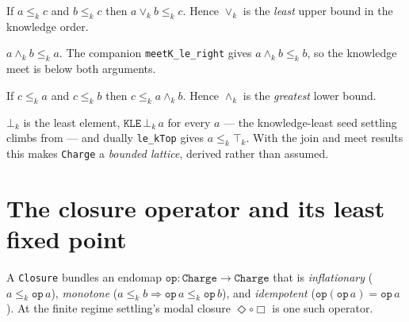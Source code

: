 \begin{theorem}\label{thm:joink-le}\leanok{}
If $a \le_k c$ and $b \le_k c$ then $a \vee_k b \le_k c$. Hence $\vee_k$ is the
\emph{least} upper bound in the knowledge order.
\end{theorem}

\begin{theorem}\label{thm:meetk-le}\leanok{}
$a \wedge_k b \le_k a$. The companion \texttt{meetK\_le\_right} gives
$a \wedge_k b \le_k b$, so the knowledge meet is below both arguments.
\end{theorem}

\begin{theorem}\label{thm:le-meetk}\leanok{}
If $c \le_k a$ and $c \le_k b$ then $c \le_k a \wedge_k b$. Hence $\wedge_k$ is
the \emph{greatest} lower bound.
\end{theorem}

\begin{theorem}\label{thm:kbot-ktop}\leanok{}
$\bot_k$ is the least element, $\texttt{KLE}\,\bot_k\,a$ for every $a$ --- the
knowledge-least seed settling climbs from --- and dually
\texttt{le\_kTop} gives $a \le_k \top_k$. With the join and meet results this
makes \texttt{Charge} a \emph{bounded lattice}, derived rather than assumed.
\end{theorem}

\section{The closure operator and its least fixed point}

\begin{definition}\label{def:closure-operator}\leanok{}
A \texttt{Closure} bundles an endomap $\texttt{op}:\texttt{Charge}\to\texttt{Charge}$
that is \emph{inflationary} ($a \le_k \texttt{op}\,a$), \emph{monotone}
($a \le_k b \Rightarrow \texttt{op}\,a \le_k \texttt{op}\,b$), and
\emph{idempotent} ($\texttt{op}(\texttt{op}\,a) = \texttt{op}\,a$). At the finite
regime settling's modal closure $\Diamond\circ\Box$ is one such operator.
\end{definition}

